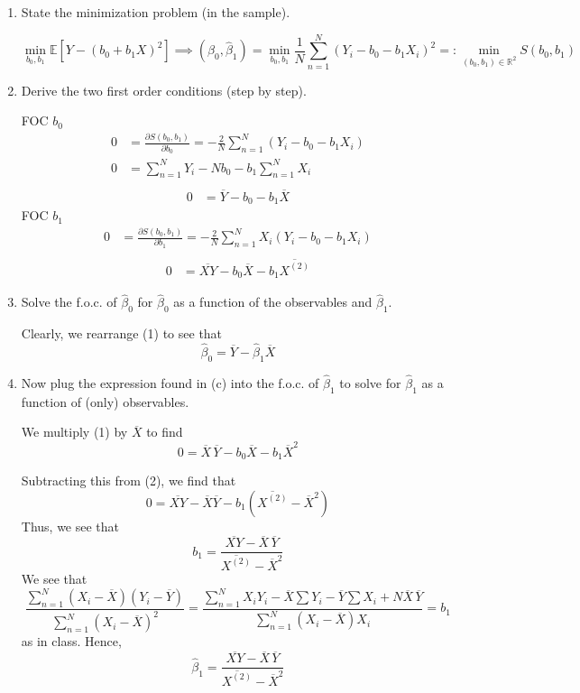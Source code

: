 \documentclass[11pt]{article}
\newcommand{\bbE}{\mathbb{E}}
\newcommand{\bbR}{\mathbb{R}}
\begin{document}
\begin{enumerate}[label=(\alph*)]
    \item State the minimization problem (in the sample).
    \begin{solution}
\[\min_{b_0, b_1}\bbE[Y - (b_0 + b_1 X)^2] \implies (\hat{\beta}_0, \hat\beta_1) = \min_{b_0, b_1} \frac{1}{N}\sum_{n=1}^N (Y_i - b_0 - b_1 X_i)^2=: \min_{(b_0, b_1) \in \bbR^2} S(b_0, b_1)\]
    \end{solution} 
    \item Derive the two first order conditions (step by step).
\begin{solution}
FOC $b_0$
    \begin{align*}
        0 &= \frac{\partial S(b_0, b_1)}{\partial b_0} = -\frac{2}{N}\sum_{n=1}^N (Y_i - b_0 - b_1 X_i) \\
        0 &= \sum_{n=1}^N Y_i - N b_0 - b_1\sum_{n=1}^N X_i\\
            \end{align*}
            \begin{align}
        0 &= \overline{Y} - b_0 - b_1 \overline{X}                
            \end{align}
FOC $b_1$   
    \begin{align*}
0 &= \frac{\partial S(b_0, b_1)}{\partial b_1} = -\frac{2}{N}\sum_{n=1}^NX_i(Y_i - b_0 - b_1 X_i)\\
    \end{align*}
    \begin{align}
        0&= \overline{XY} - b_0\overline{X} - b_1\overline{X^{(2)}}
    \end{align}
\end{solution}
    \item Solve the f.o.c. of \( \hat{\beta}_0 \) for \( \hat{\beta}_0 \) as a function of the observables and \( \hat{\beta}_1 \).
\begin{solution}
Clearly, we rearrange (1) to see that 
\[\hat{\beta}_0 = \overline{Y} - \hat{\beta}_1 \overline{X}\]
\end{solution}
    \item Now plug the expression found in (c) into the f.o.c. of \( \hat{\beta}_1 \) to solve for \( \hat{\beta}_1 \) as a function of (only) observables.
\begin{solution}
    We multiply (1) by $\overline{X}$ to find 
    \[0 = \overline{X}\,\overline{Y} - b_0 \overline{X} - b_1\overline{X}^2\]

    Subtracting this from (2), we find that 
    \[0 = \overline{XY} - \overline{X}\overline{Y} - b_1 (\overline{X^{(2)} } - \overline{X}^2)\] Thus, we see that 
    \[b_1 = \frac{\overline{XY} - \overline{X}\,\overline{Y}}{\overline{X^{(2)} } - \overline{X}^2}\] We see that 
    \[\frac{\sum_{n=1}^N (X_i - \overline{X})(Y_i - \overline{Y})}{\sum_{n=1}^N (X_i - \overline{X})^2} = \frac{\sum_{n=1}^NX_iY_i - \overline{X} \sum Y_i - \overline{Y}\sum X_i + N\overline{X}\,\overline{Y}}{\sum_{n=1}^N (X_i - \overline{X})X_i} = b_1\] as in class. Hence, 
    \[\hat{\beta}_1 = \frac{\overline{XY} - \overline{X}\,\overline{Y}}{\overline{X^{(2)} } - \overline{X}^2}\]
\end{solution}
\end{enumerate}
\end{document}
